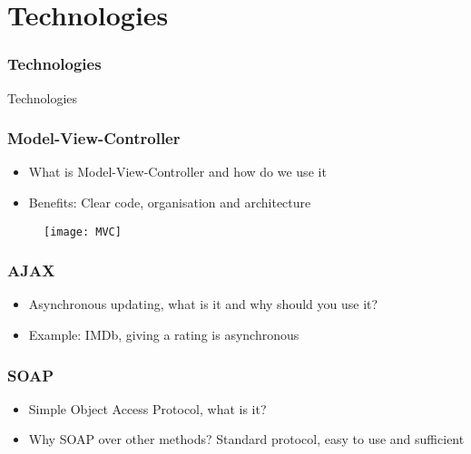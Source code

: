 \section{Technologies}
\begin{frame}
\frametitle{Technologies}
\centering
\Huge Technologies
\end{frame}
\begin{frame}

\frametitle{Model-View-Controller}
\begin{itemize}
\item What is Model-View-Controller and how do we use it
\item Benefits: Clear code, organisation and architecture
\end{itemize}
\begin{figure}
\centering
\texttt{[image: MVC]}
\end{figure}
\end{frame}

\begin{frame}
\frametitle{AJAX}
\begin{itemize}
\item Asynchronous updating, what is it and why should you use it?
\item Example: IMDb, giving a rating is asynchronous
\end{itemize}
\end{frame}

\begin{frame}
\frametitle{SOAP}
\begin{itemize}
\item Simple Object Access Protocol, what is it?
\item Why SOAP over other methods? Standard protocol, easy to use and sufficient
\end{itemize}
\end{frame}